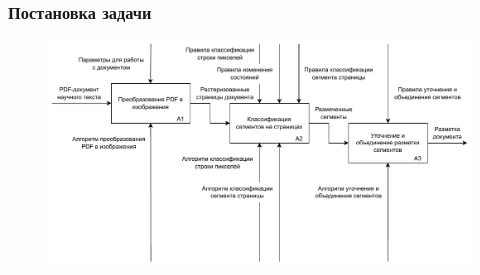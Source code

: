 \documentclass[gray]{beamer}
\begin{document}
\begin{frame}
    \frametitle{Постановка задачи}
    \begin{figure}[H]
        \begin{center}
            \includegraphics[width=1\textwidth]{diag/a1.pdf}
        \end{center}
    \end{figure}

\end{frame}
\end{document}
